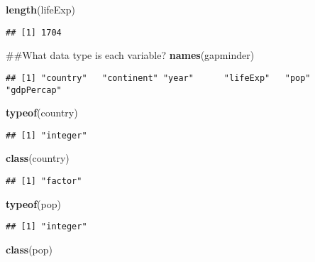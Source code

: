 \documentclass[]{article}
\newenvironment{Shaded}{\begin{snugshade}}{\end{snugshade}}
\newcommand{\KeywordTok}[1]{\textcolor[rgb]{0.13,0.29,0.53}{\textbf{#1}}}
\newcommand{\NormalTok}[1]{#1}
\begin{document}
\begin{Shaded}
\begin{Highlighting}[]
\KeywordTok{length}\NormalTok{(lifeExp)}
\end{Highlighting}
\end{Shaded}

\begin{verbatim}
## [1] 1704
\end{verbatim}

\begin{Shaded}
\begin{Highlighting}[]
\NormalTok{##What data type is each variable?}
\KeywordTok{names}\NormalTok{(gapminder)}
\end{Highlighting}
\end{Shaded}

\begin{verbatim}
## [1] "country"   "continent" "year"      "lifeExp"   "pop"       "gdpPercap"
\end{verbatim}

\begin{Shaded}
\begin{Highlighting}[]
\KeywordTok{typeof}\NormalTok{(country)}
\end{Highlighting}
\end{Shaded}

\begin{verbatim}
## [1] "integer"
\end{verbatim}

\begin{Shaded}
\begin{Highlighting}[]
\KeywordTok{class}\NormalTok{(country)}
\end{Highlighting}
\end{Shaded}

\begin{verbatim}
## [1] "factor"
\end{verbatim}

\begin{Shaded}
\begin{Highlighting}[]
\KeywordTok{typeof}\NormalTok{(pop)}
\end{Highlighting}
\end{Shaded}

\begin{verbatim}
## [1] "integer"
\end{verbatim}

\begin{Shaded}
\begin{Highlighting}[]
\KeywordTok{class}\NormalTok{(pop)}
\end{Highlighting}
\end{Shaded}
\end{document}
